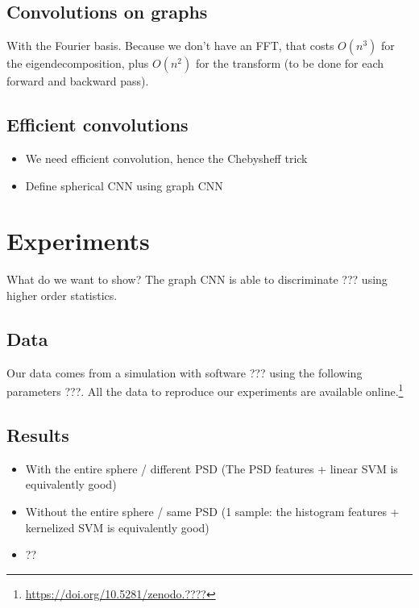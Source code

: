 \documentclass[preprint,12pt,authoryear]{elsarticle}
\newcommand{\todo}[1]{{\color[rgb]{.6,.1,.6}{#1}}}
\newcommand{\assign}[1]{{\color[rgb]{.8,.5,.8}{Assigned: #1 }}}
\begin{document}
\subsection{Convolutions on graphs}
\assign{Nathanaël, Michaël}

With the Fourier basis. Because we don't have an FFT, that costs $O(n^3)$ for the eigendecomposition, plus $O(n^2)$ for the transform (to be done for each forward and backward pass).

\subsection{Efficient convolutions}
\assign{Michaël}

\begin{itemize}
	\item We need efficient convolution, hence the Chebysheff trick
	\item Define spherical CNN using graph CNN
\end{itemize}

\section{Experiments}

What do we want to show? The graph CNN is able to discriminate ??? using higher order statistics.

\subsection{Data}
\assign{Tomek}

Our data comes from a simulation with software ??? using the following parameters ???. All the data to reproduce our experiments are available online.\footnote{\url{https://doi.org/10.5281/zenodo.????} \todo{correct DOI}}

\subsection{Results}
\assign{Nathanaël, Tomek}

\begin{itemize}
	\item With the entire sphere / different PSD (The PSD features + linear SVM is equivalently good)
	\item Without the entire sphere / same PSD (1 sample: the histogram features + kernelized SVM is equivalently good)
	\item ??
\end{itemize}
\end{document}
